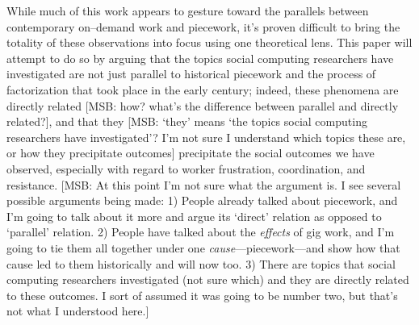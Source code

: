 \documentclass{sigchi}
\newcommand{\msb}[1]{{\color{PineGreen}[MSB: #1]}}
\begin{document}
While much of this work appears to gesture toward
the parallels between contemporary on--demand work and piecework,
it's proven difficult to bring the totality of these observations into focus using one theoretical lens.
This paper will attempt to do so by arguing that
the topics social computing researchers have investigated are
not just parallel to historical piecework and
the process of factorization that took place in the early  century;
indeed, these phenomena are directly related \msb{how? what's the difference between parallel and directly related?}, and that they \msb{`they' means `the topics social computing researchers have investigated'? I'm not sure I understand which topics these are, or how they precipitate outcomes} precipitate
the social outcomes we have observed,
especially with regard to worker frustration, coordination, and resistance.
\msb{At this point I'm not sure what the argument is. I see several possible arguments being made: 1) People already talked about piecework, and I'm going to talk about it more and argue its `direct' relation as opposed to `parallel' relation. 2) People have talked about the \textit{effects} of gig work, and I'm going to tie them all together under one \textit{cause}---piecework---and show how that cause led to them historically and will now too. 3) There are topics that social computing researchers investigated (not sure which) and they are directly related to these outcomes. I sort of assumed it was going to be number two, but that's not what I understood here.}

\end{document}

